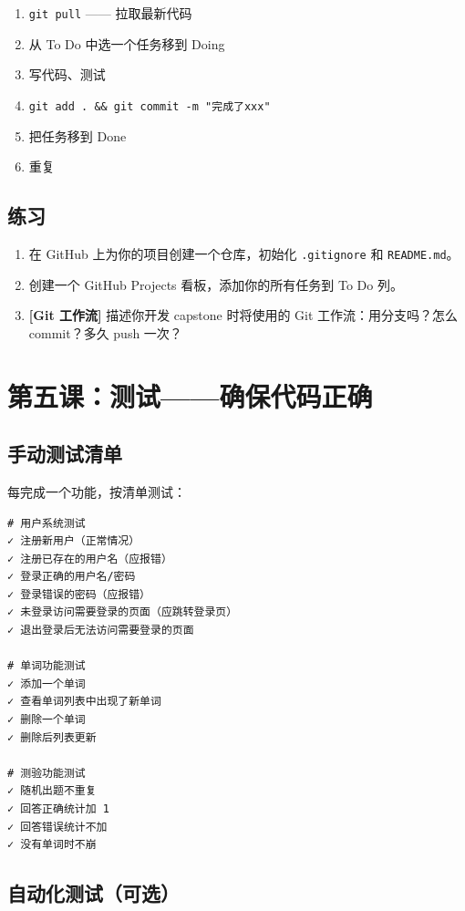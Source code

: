 \documentclass[a4paper,12pt]{ctexart}
\begin{document}
\begin{enumerate}
  \item \texttt{git pull} —— 拉取最新代码
  \item 从 To Do 中选一个任务移到 Doing
  \item 写代码、测试
  \item \texttt{git add . \&\& git commit -m "完成了xxx"}
  \item 把任务移到 Done
  \item 重复
\end{enumerate}

\subsection*{练习}

\begin{enumerate}
  \item 在 GitHub 上为你的项目创建一个仓库，初始化 \texttt{.gitignore} 和 \texttt{README.md}。
  \item 创建一个 GitHub Projects 看板，添加你的所有任务到 To Do 列。
  \item \textbf{[Git 工作流]} 描述你开发 capstone 时将使用的 Git 工作流：用分支吗？怎么 commit？多久 push 一次？
\end{enumerate}

\section*{第五课：测试——确保代码正确}

\subsection*{手动测试清单}

每完成一个功能，按清单测试：

\begin{lstlisting}
# 用户系统测试
✓ 注册新用户（正常情况）
✓ 注册已存在的用户名（应报错）
✓ 登录正确的用户名/密码
✓ 登录错误的密码（应报错）
✓ 未登录访问需要登录的页面（应跳转登录页）
✓ 退出登录后无法访问需要登录的页面

# 单词功能测试
✓ 添加一个单词
✓ 查看单词列表中出现了新单词
✓ 删除一个单词
✓ 删除后列表更新

# 测验功能测试
✓ 随机出题不重复
✓ 回答正确统计加 1
✓ 回答错误统计不加
✓ 没有单词时不崩
\end{lstlisting}

\subsection*{自动化测试（可选）}
\end{document}
